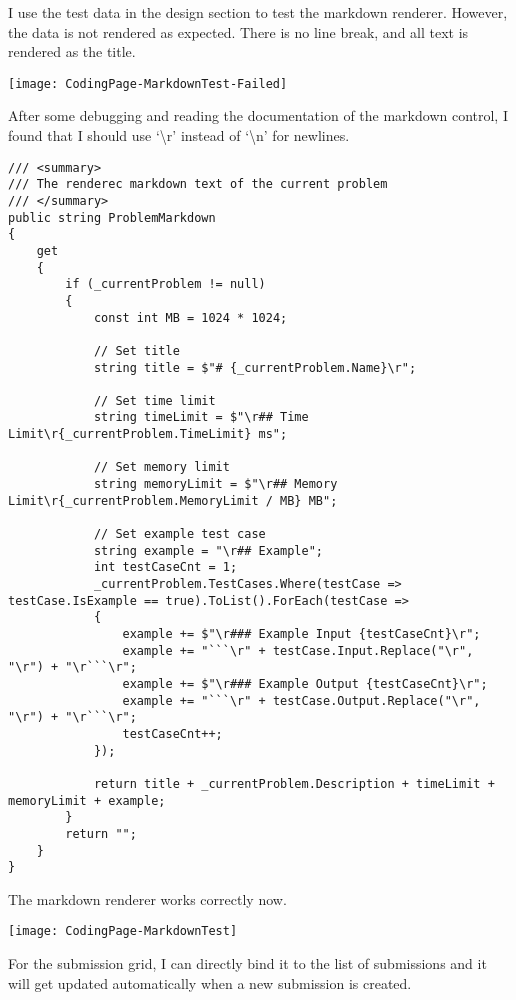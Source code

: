 \documentclass[report.tex]{subfiles}
\begin{document}
I use the test data in the design section to test the markdown renderer. However, the data is not rendered as expected. There is no line break, and all text is rendered as the title.

\texttt{[image: CodingPage-MarkdownTest-Failed]}

After some debugging and reading the documentation of the markdown control, I found that I should use `\textbackslash r' instead of `\textbackslash n' for newlines.

\begin{verbatim}
/// <summary>
/// The renderec markdown text of the current problem
/// </summary>
public string ProblemMarkdown
{
    get
    {
        if (_currentProblem != null)
        {
            const int MB = 1024 * 1024;
            
            // Set title
            string title = $"# {_currentProblem.Name}\r";
            
            // Set time limit
            string timeLimit = $"\r## Time Limit\r{_currentProblem.TimeLimit} ms";
            
            // Set memory limit
            string memoryLimit = $"\r## Memory Limit\r{_currentProblem.MemoryLimit / MB} MB";
            
            // Set example test case
            string example = "\r## Example";
            int testCaseCnt = 1;
            _currentProblem.TestCases.Where(testCase => testCase.IsExample == true).ToList().ForEach(testCase =>
            {
                example += $"\r### Example Input {testCaseCnt}\r";
                example += "```\r" + testCase.Input.Replace("\r", "\r") + "\r```\r";
                example += $"\r### Example Output {testCaseCnt}\r";
                example += "```\r" + testCase.Output.Replace("\r", "\r") + "\r```\r";
                testCaseCnt++;
            });

            return title + _currentProblem.Description + timeLimit + memoryLimit + example;
        }
        return "";
    }
}
\end{verbatim}

The markdown renderer works correctly now.

\texttt{[image: CodingPage-MarkdownTest]}

For the submission grid, I can directly bind it to the list of submissions and it will get updated automatically when a new submission is created.
\end{document}
